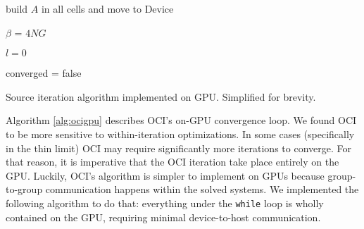 \DontPrintSemicolon
\begin{algorithm}
    \label{alg:si}
    build $A$ in all cells and move to Device

    $\beta$ = $4NG$  %

    $l = 0$ 

    converged = false

    \caption{Source iteration algorithm implemented on GPU. Simplified for brevity.}
\end{algorithm}

Algorithm \ref{alg:ocigpu} describes OCI's on-GPU convergence loop.
We found OCI to be more sensitive to within-iteration optimizations.
In some cases (specifically in the thin limit) OCI may require significantly more iterations to converge.
For that reason, it is imperative that the OCI iteration take place entirely on the GPU.
Luckily, OCI's algorithm is simpler to implement on GPUs because group-to-group communication happens within the solved systems.
We implemented the following algorithm to do that: everything under the \texttt{while} loop is wholly contained on the GPU, requiring minimal device-to-host communication.

